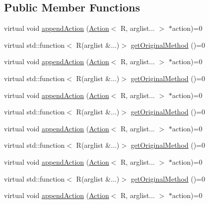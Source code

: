 \subsection*{Public Member Functions}
\begin{DoxyCompactItemize}
\item 
virtual void \mbox{\hyperlink{structfakeit_1_1SpyingContext_ae7eaf07b2bf6a451e5831bfa2769e9c6}{append\+Action}} (\mbox{\hyperlink{structfakeit_1_1Action}{Action}}$<$ R, arglist... $>$ $\ast$action)=0
\item 
virtual std\+::function$<$ R(arglist \&...)$>$ \mbox{\hyperlink{structfakeit_1_1SpyingContext_ad93f55614a19d084778f2ca96aca8037}{get\+Original\+Method}} ()=0
\item 
virtual void \mbox{\hyperlink{structfakeit_1_1SpyingContext_ae7eaf07b2bf6a451e5831bfa2769e9c6}{append\+Action}} (\mbox{\hyperlink{structfakeit_1_1Action}{Action}}$<$ R, arglist... $>$ $\ast$action)=0
\item 
virtual std\+::function$<$ R(arglist \&...)$>$ \mbox{\hyperlink{structfakeit_1_1SpyingContext_ad93f55614a19d084778f2ca96aca8037}{get\+Original\+Method}} ()=0
\item 
virtual void \mbox{\hyperlink{structfakeit_1_1SpyingContext_ae7eaf07b2bf6a451e5831bfa2769e9c6}{append\+Action}} (\mbox{\hyperlink{structfakeit_1_1Action}{Action}}$<$ R, arglist... $>$ $\ast$action)=0
\item 
virtual std\+::function$<$ R(arglist \&...)$>$ \mbox{\hyperlink{structfakeit_1_1SpyingContext_ad93f55614a19d084778f2ca96aca8037}{get\+Original\+Method}} ()=0
\item 
virtual void \mbox{\hyperlink{structfakeit_1_1SpyingContext_ae7eaf07b2bf6a451e5831bfa2769e9c6}{append\+Action}} (\mbox{\hyperlink{structfakeit_1_1Action}{Action}}$<$ R, arglist... $>$ $\ast$action)=0
\item 
virtual std\+::function$<$ R(arglist \&...)$>$ \mbox{\hyperlink{structfakeit_1_1SpyingContext_ad93f55614a19d084778f2ca96aca8037}{get\+Original\+Method}} ()=0
\item 
virtual void \mbox{\hyperlink{structfakeit_1_1SpyingContext_ae7eaf07b2bf6a451e5831bfa2769e9c6}{append\+Action}} (\mbox{\hyperlink{structfakeit_1_1Action}{Action}}$<$ R, arglist... $>$ $\ast$action)=0
\item 
virtual std\+::function$<$ R(arglist \&...)$>$ \mbox{\hyperlink{structfakeit_1_1SpyingContext_ad93f55614a19d084778f2ca96aca8037}{get\+Original\+Method}} ()=0
\item 
virtual void \mbox{\hyperlink{structfakeit_1_1SpyingContext_ae7eaf07b2bf6a451e5831bfa2769e9c6}{append\+Action}} (\mbox{\hyperlink{structfakeit_1_1Action}{Action}}$<$ R, arglist... $>$ $\ast$action)=0

\end{DoxyCompactItemize}
